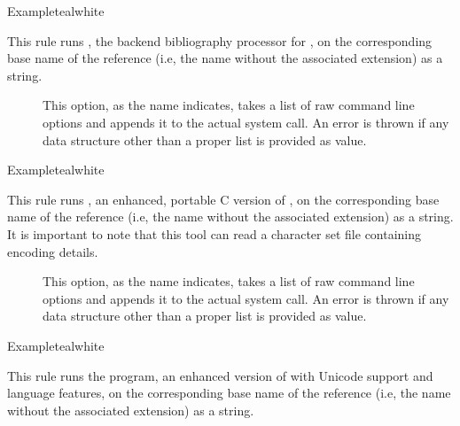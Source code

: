 \begin{description}
\begin{codebox}{Example}{teal}{\icnote}{white}
\end{codebox}

\item[\rulebox{biber}{Marco Daniel, Paulo Cereda}] This rule runs , the backend bibliography processor for , on the corresponding base name of the  reference (i.e, the name without the associated extension) as a string.

\begin{description}
\item[] This option, as the name indicates, takes a list of raw command line options and appends it to the actual system call. An error is thrown if any data structure other than a proper list is provided as value.
\end{description}

\begin{codebox}{Example}{teal}{\icnote}{white}
\end{codebox}

\item[\rulebox{bibtex8}{Marco Daniel, Paulo Cereda}] This rule runs , an enhanced, portable C version of , on the corresponding base name of the  reference (i.e, the name without the associated extension) as a string. It is important to note that this tool can read a character set file containing encoding details.

\begin{description}
\item[] This option, as the name indicates, takes a list of raw command line options and appends it to the actual system call. An error is thrown if any data structure other than a proper list is provided as value.
\end{description}

\begin{codebox}{Example}{teal}{\icnote}{white}
\end{codebox}

\item[\rulebox{bibtexu}{Marco Daniel, Paulo Cereda}] This rule runs the  program, an enhanced version of  with Unicode support and language features, on the corresponding base name of the  reference (i.e, the name without the associated extension) as a string.


\end{description}
